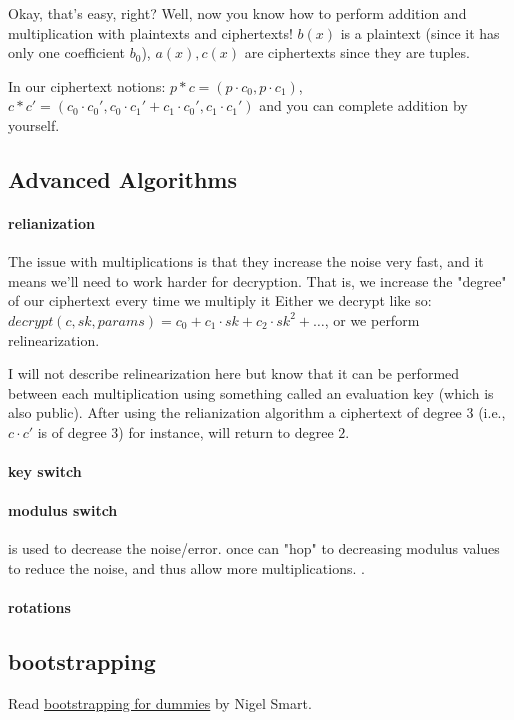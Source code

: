 Okay, that's easy, right? Well, now you know how to perform addition and multiplication with plaintexts and ciphertexts!
$b(x)$ is a plaintext (since it has only one coefficient $b_0$), $a(x),c(x)$ are ciphertexts
since they are tuples.

In our ciphertext notions:
$p*c=(p\cdot c_0, p\cdot c_1)$,
$c*c'=(c_0\cdot c_0', c_0\cdot c_1' + c_1\cdot c_0', c_1\cdot c_1')$ and you can complete addition by yourself.

\subsection{Advanced Algorithms}
\paragraph{relianization}
The issue with multiplications is that they increase the noise very fast, and it means we'll need to work harder 
for decryption. That is, we increase the "degree" of our ciphertext every time we multiply it
Either we decrypt like so: $decrypt(c, sk, params)= c_0 +c_1\cdot sk+c_2\cdot sk^2+\dots$, 
or we perform relinearization.

I will not describe relinearization here but know that it can be performed between each multiplication
using something called an evaluation key (which is also public). After using the relianization algorithm 
a ciphertext of degree $3$ (i.e., $c\cdot c'$ is of degree $3$) for instance, will return to degree $2$.

\paragraph{key switch}
\paragraph{modulus switch}
is used to decrease the noise/error. once can "hop" to decreasing modulus values to reduce the noise, and thus allow 
more multiplications. .

\paragraph{rotations}
\subsection{bootstrapping}
Read \href{https://www.zama.ai/post/what-is-bootstrapping-homomorphic-encryption}{bootstrapping for dummies} by Nigel Smart.

